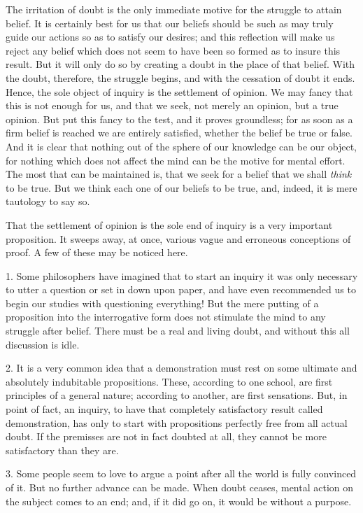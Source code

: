 The irritation of doubt is the only immediate motive for the struggle to attain belief. It is certainly best for us that our beliefs should be such as may truly guide our actions so as to satisfy our desires; and this reflection will make us reject any belief which does not seem to have been so formed as to insure this result. But it will only do so by creating a doubt in the place of that belief. With the doubt, therefore, the struggle begins, and with the cessation of doubt it ends. Hence, the sole object of inquiry is the settlement of opinion. We may fancy that this is not enough for us, and that we seek, not merely an opinion, but a true opinion. But put this fancy to the test, and it proves groundless; for as soon as a firm belief is reached we are entirely satisfied, whether the belief be true or false. And it is clear that nothing out of the sphere of our knowledge can be our object, for nothing which does not affect the mind can be the motive for mental effort. The most that can be maintained is, that we seek for a belief that we shall \emph{think}  to be true. But we think each one of our beliefs to be true, and, indeed, it is mere tautology to say so.

That the settlement of opinion is the sole end of inquiry is a very important proposition. It sweeps away, at once, various vague and erroneous conceptions of proof. A few of these may be noticed here.

1. Some philosophers have imagined that to start an inquiry it was only necessary to utter a question or set in down upon paper, and have even recommended us to begin our studies with questioning everything!  But the mere putting of a proposition into the interrogative form does not stimulate the mind to any struggle after belief.  There must be a real and living doubt, and without this all discussion is idle. 

2. It is a very common idea that a demonstration must rest on some ultimate and absolutely indubitable propositions. These, according to one school, are first principles of a general nature; according to another, are first sensations. But, in point of fact, an inquiry, to have that completely satisfactory result called demonstration, has only to start with propositions perfectly free from all actual doubt. If the premisses are not in fact doubted at all, they cannot be more satisfactory than they are.

3. Some people seem to love to argue a point after all the world is fully convinced of it. But no further advance can be made. When doubt ceases, mental action on the subject comes to an end; and, if it did go on, it would be without a purpose.

